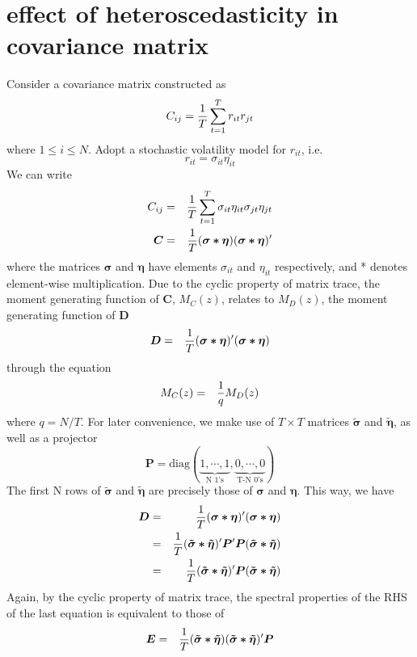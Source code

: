 \message{ !name(draft4.tex)}\documentclass{article}
\begin{document}

\section{effect of heteroscedasticity in covariance matrix}
Consider a covariance matrix constructed as
$$
C_{ij} = {1 \over T}\sum_{t=1}^T r_{it} r_{jt}
$$
where $1 \leq i \leq N$. Adopt a stochastic volatility model for
$r_{it}$, i.e.
$$
r_{it} = \sigma_{it} \eta_{it}
$$
We can write
\begin{eqnarray*}
C_{ij} &=& {1 \over T}\sum_{t=1}^T \sigma_{it} \eta_{it} \sigma_{jt}
\eta_{jt} \\
\bm{C} &=& {1 \over T} (\bm{\sigma * \eta}) (\bm{\sigma * \eta})'
\end{eqnarray*}
where the matrices $\bm{\sigma}$ and $\bm{\eta}$ have elements
$\sigma_{it}$ and $\eta_{it}$ respectively, and * denotes element-wise
multiplication. Due to the cyclic property of matrix trace, the
moment generating function of $\bm{C}$, $M_C(z)$, relates to $M_D(z)$,
the moment generating function of $\bm D$
\begin{eqnarray*}
  \bm{D} &=& {1 \over T} (\bm{\sigma * \eta})' (\bm{\sigma * \eta})
\end{eqnarray*}
through the equation
\begin{eqnarray*}
  M_C(z) &=& {1 \over q} M_D(z)
\end{eqnarray*}
where $q = N/T$. For later convenience, we make use of $T \times T$
matrices $\bm{\tilde{\sigma}}$ and $\bm{\tilde{\eta}}$, as well as a
projector
$$
\bm{P} = \text{diag}(\underbrace{1, \cdots, 1}_{\text{N 1's}}, 
\underbrace{0, \cdots, 0}_{\text{T-N 0's}})
$$
The first N rows of $\bm{\tilde{\sigma}}$ and $\bm{\tilde{\eta}}$ are
precisely those of $\bm{\sigma}$ and $\bm{\eta}$. This way, we have
\begin{eqnarray*}
\bm D &=& {1 \over T} (\bm{\sigma * \eta})' (\bm{\sigma * \eta}) \\
&=& {1 \over T} (\bm{\tilde{\sigma} * \tilde{\eta}})' \bm P'
\bm P (\bm{\tilde{\sigma} * \tilde{\eta}}) \\
&=& {1 \over T} (\bm{\tilde{\sigma} * \tilde{\eta}})'
\bm P (\bm{\tilde{\sigma} * \tilde{\eta}}) \\
\end{eqnarray*}
Again, by the cyclic property of matrix trace, the spectral properties
of the RHS of the last equation is equivalent to those of
\begin{eqnarray*}
  \bm E &=& {1 \over T} (\bm{\tilde{\sigma} * \tilde{\eta}}) (\bm{\tilde{\sigma}
    * \tilde{\eta}})' \bm P \\
\end{eqnarray*}
\end{document}
